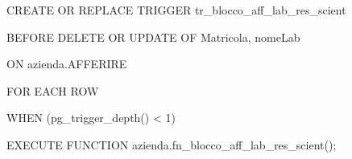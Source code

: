     \ttfamily
        \begin{flushleft}
            \begin{description}
                \item CREATE OR REPLACE TRIGGER tr\_blocco\_aff\_lab\_res\_scient
                \item BEFORE DELETE OR UPDATE OF Matricola, nomeLab
                \item ON azienda.AFFERIRE
                \item FOR EACH ROW
                \item WHEN (pg\_trigger\_depth() < 1)
                \item EXECUTE FUNCTION azienda.fn\_blocco\_aff\_lab\_res\_scient();
            \end{description}
        \end{flushleft}
    \normalfont

